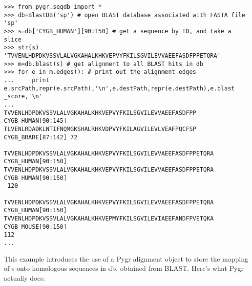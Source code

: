 \documentclass{howto}
\begin{document}
\begin{verbatim}
>>> from pygr.seqdb import *
>>> db=BlastDB('sp') # open BLAST database associated with FASTA file 'sp'
>>> s=db['CYGB_HUMAN'][90:150] # get a sequence by ID, and take a slice
>>> str(s)
'TVVENLHDPDKVSSVLALVGKAHALKHKVEPVYFKILSGVILEVVAEEFASDFPPETQRA'
>>> m=db.blast(s) # get alignment to all BLAST hits in db
>>> for e in m.edges(): # print out the alignment edges
...     print e.srcPath,repr(e.srcPath),'\n',e.destPath,repr(e.destPath),e.blast
_score,'\n'
... 
TVVENLHDPDKVSSVLALVGKAHALKHKVEPVYFKILSGVILEVVAEEFASDFPP CYGB_HUMAN[90:145] 
TLVENLRDADKLNTIFNQMGKSHALRHKVDPVYFKILAGVILEVLVEAFPQCFSP CYGB_BRARE[87:142] 72

TVVENLHDPDKVSSVLALVGKAHALKHKVEPVYFKILSGVILEVVAEEFASDFPPETQRA CYGB_HUMAN[90:150] 
TVVENLHDPDKVSSVLALVGKAHALKHKVEPVYFKILSGVILEVVAEEFASDFPPETQRA CYGB_HUMAN[90:150]
 120

TVVENLHDPDKVSSVLALVGKAHALKHKVEPVYFKILSGVILEVVAEEFASDFPPETQRA CYGB_HUMAN[90:150] 
TVVENLHDPDKVSSVLALVGKAHALKHKVEPMYFKILSGVILEVIAEEFANDFPVETQKA CYGB_MOUSE[90:150]
112 
...
\end{verbatim}

This example introduces the use of a Pygr alignment object to store the mapping of s onto homologous sequences in db, obtained from BLAST.  Here's what Pygr actually does:
\end{document}
